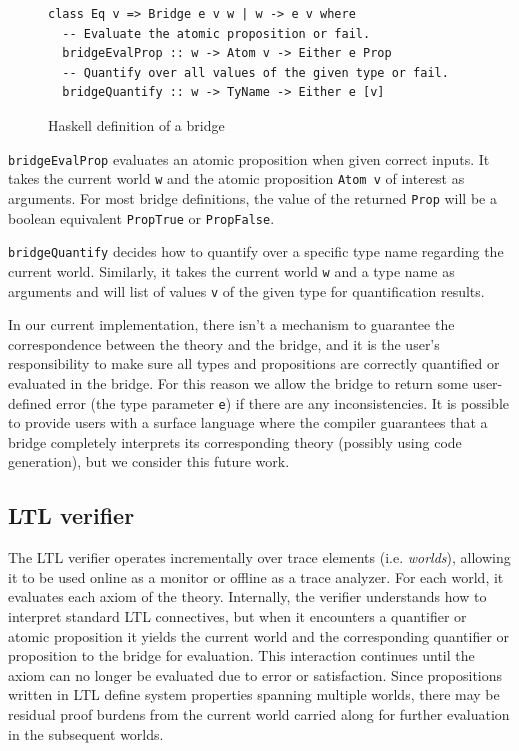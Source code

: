 \documentclass[format=acmsmall, nonacm=true, review=true, screen=true]{acmart}
\newcommand{\mycaption}[1]{\Description{#1}\caption{#1}}
\begin{document}
\begin{figure}[h]
  {
    \fontsize{10}{12}\selectfont
    \begin{verbatim}
class Eq v => Bridge e v w | w -> e v where
  -- Evaluate the atomic proposition or fail.
  bridgeEvalProp :: w -> Atom v -> Either e Prop
  -- Quantify over all values of the given type or fail.
  bridgeQuantify :: w -> TyName -> Either e [v]
\end{verbatim}
  }
  \mycaption{Haskell definition of a bridge}
  \label{fig:bridge-sig}
\end{figure}

\texttt{bridgeEvalProp} evaluates an atomic proposition when given correct inputs. It takes the current world \texttt{w} and the atomic proposition \texttt{Atom v} of interest as arguments.
For most bridge definitions, the value of the returned \texttt{Prop} will be a boolean equivalent \texttt{PropTrue} or \texttt{PropFalse}.

\texttt{bridgeQuantify} decides how to quantify over a specific type name regarding the current world.
Similarly, it takes the current world \texttt{w} and a type name as arguments and will list of values \texttt{v} of the given type for quantification results.

In our current implementation, there isn't a mechanism to guarantee the correspondence between the theory and the bridge, and it is the user's responsibility to make sure all types and propositions are correctly quantified or evaluated in the bridge. For this reason we allow the bridge to return some user-defined error (the type parameter \texttt{e}) if there are any inconsistencies.
It is possible to provide users with a surface language where the compiler guarantees that a bridge completely interprets its corresponding theory (possibly using code generation), but we consider this future work.

\subsection{LTL verifier}

The LTL verifier operates incrementally over trace elements (i.e. \textit{worlds}), allowing it to be used online as a monitor or offline as a trace analyzer.
For each world, it evaluates each axiom of the theory. Internally, the verifier understands how to interpret standard LTL connectives, but when it encounters a quantifier or atomic proposition it yields the current world and the corresponding quantifier or proposition to the bridge for evaluation.
This interaction continues until the axiom can no longer be evaluated due to error or satisfaction.
Since propositions written in LTL define system properties spanning multiple worlds, there may be residual proof burdens from the current world carried along for further evaluation in the subsequent worlds.
\end{document}
